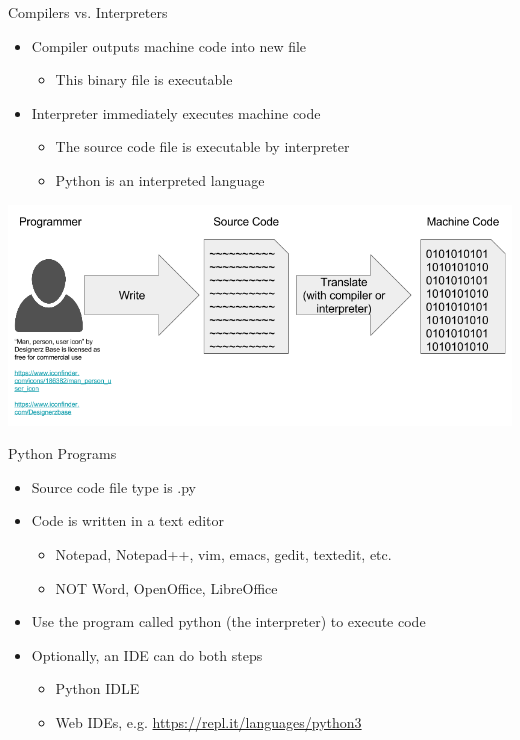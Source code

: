 \begin{frame}{Compilers vs. Interpreters}
\begin{itemize}
\item Compiler outputs machine code into new file
  \begin{itemize}
    \item This binary file is executable
  \end{itemize}
\item Interpreter immediately executes machine code
  \begin{itemize}
    \item The source code file is executable by interpreter
    \item Python is an interpreted language
  \end{itemize}
\end{itemize}
\begin{center}
\includegraphics[scale=.34]{human-source-machine.png}
\end{center}
\end{frame}

\begin{frame}{Python Programs}
\begin{itemize}
\item Source code file type is .py
\item Code is written in a text editor
\begin{itemize}
\item Notepad, Notepad++, vim, emacs, gedit, textedit, etc.
\item NOT Word, OpenOffice, LibreOffice
\end{itemize}
\item Use the program called python (the interpreter) to execute code
\item Optionally, an IDE can do both steps
  \begin{itemize}
    \item Python IDLE
    \item Web IDEs, e.g. \url{https://repl.it/languages/python3}
  \end{itemize}
\end{itemize}
\end{frame}

